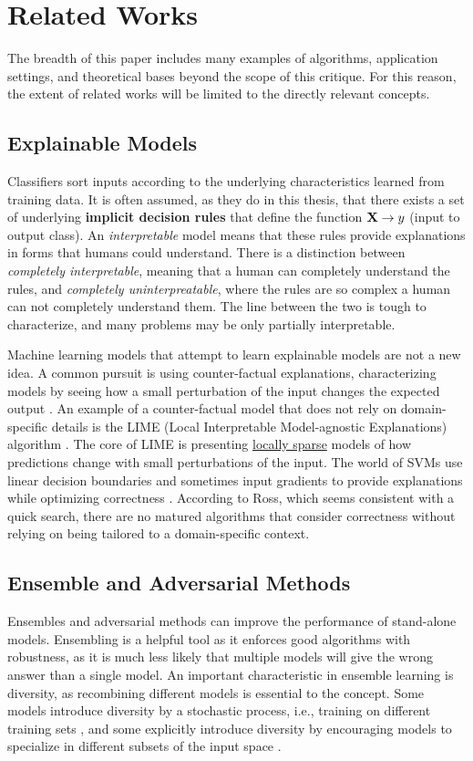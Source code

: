 \documentclass[twoside,11pt]{article}
\begin{document}

\section{Related Works}
\label{sec:related works}
The breadth of this paper includes many examples of algorithms, application settings, and theoretical bases beyond the scope of this critique. For this reason, the extent of related works will be limited to the directly relevant concepts.
\subsection{Explainable Models}
Classifiers sort inputs according to the underlying characteristics learned from training data. It is often assumed, as they do in this thesis, that there exists a set of underlying \textbf{implicit decision rules} that define the function $\vb{X} \rightarrow y$ (input to output class). An \textit{interpretable} model means that these rules provide explanations in forms that humans could understand. There is a distinction between \textit{completely interpretable}, meaning that a human can completely understand the rules, and \textit{completely uninterpreatable}, where the rules are so complex a human can not completely understand them. The line between the two is tough to characterize, and many problems may be only partially interpretable. 

Machine learning models that attempt to learn explainable models are not a new idea. A common pursuit is using counter-factual explanations, characterizing models by seeing how a small perturbation of the input changes the expected output \citep{2016:lungberg}. An example of a counter-factual model that does not rely on domain-specific details is the LIME (Local Interpretable Model-agnostic Explanations) algorithm \citep{2016:Ribeioro}. The core of LIME is presenting \underline{locally sparse} models of how predictions change with small perturbations of the input. The world of SVMs use linear decision boundaries and sometimes input gradients to provide explanations while optimizing correctness \citep{2007:zaidan}. According to Ross, which seems consistent with a quick search, there are no matured algorithms that consider correctness without relying on being tailored to a domain-specific context. 

\subsection{Ensemble and Adversarial Methods}
Ensembles and adversarial methods can improve the performance of stand-alone models. Ensembling is a helpful tool as it enforces good algorithms with robustness, as it is much less likely that multiple models will give the wrong answer than a single model. An important characteristic in ensemble learning is diversity, as recombining different models is essential to the concept. Some models introduce diversity by a stochastic process, i.e., training on different training sets \citep{breiman2001random}, and some explicitly introduce diversity by encouraging models to specialize in different subsets of the input space \citep{zhou2018diverse}. 
\end{document}
